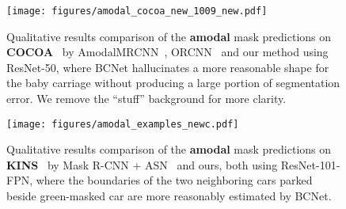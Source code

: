 \begin{comment}
\begin{wrapfigure}{R}{0.4\textwidth}
	\centering
	\texttt{[image: figures/panet\_2.png]}
	\caption{\label{fig:frog1}This is a fcaption xxxxxxxxxxxxxx.}
\end{wrapfigure}\leavevmode
\lipsum[1-2]


\begin{table}
	\caption{Performance comparison on COCO-OCC split.}
	\centering
	\label{wrap-tab:1}
	\resizebox{0.6\linewidth}{!}{
	\begin{tabular}{l | c | c }
	\toprule
	Model &  &  \\
	\midrule
	Mask R-CNN~\cite{he2016deep} & 29.67 & 49.95 \\
	MS R-CNN~\cite{huang2019mask} & 30.32 & 50.01 \\
	CenterMask~\cite{lee2019centermask} & 29.05 & 49.07 \\
	\midrule
	\textbf{Ours} & 31.71 & 51.15\\
	\textbf{Ours + Synthetic} & \textbf{32.89} & \textbf{53.25}\\
	\bottomrule
    \end{tabular}
}
\label{table:occ}
\end{table} 
\end{comment}

\begin{figure}[!t]
	\centering
\texttt{[image: figures/amodal\_cocoa\_new\_1009\_new.pdf]}
	\caption{Qualitative results comparison of the \textbf{amodal }mask predictions on \textbf{COCOA}~\cite{zhu2017semantic} by AmodalMRCNN~\cite{follmann2019learning}, ORCNN~\cite{follmann2019learning} and our method using ResNet-50, where BCNet hallucinates a more reasonable shape for the baby carriage without producing a large portion of segmentation error. We remove the ``stuff'' background for more clarity. }
	\label{fig:amodal_example1}
	\vspace{-0.1in}
\end{figure}

\begin{figure}[!t]
	\centering
\texttt{[image: figures/amodal\_examples\_newc.pdf]}
	\caption{Qualitative results comparison of the \textbf{amodal} mask predictions on \textbf{KINS}~\cite{qi2019amodal} by Mask R-CNN + ASN~\cite{qi2019amodal} and ours, both using ResNet-101-FPN, where the boundaries of the two neighboring cars parked beside green-masked car are more reasonably estimated by BCNet. }
\label{fig:amodal_example2}
	\vspace{-0.1in}
\end{figure}

